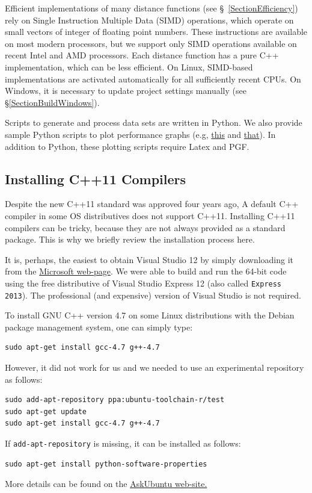 \documentclass[runningheads,a4paper]{llncs}
\newcommand{\ttt}[1]{\texttt{#1}}
\begin{document}
{Efficient implementations of many distance functions (see \S~\ref{SectionEfficiency})
rely on Single Instruction Multiple Data (SIMD) operations,
which operate on small  vectors of integer of floating point numbers. 
These instructions are available on most modern processors,
but we support only SIMD operations available on recent Intel and AMD processors.   
Each distance function has a pure C++ implementation,
which can be less efficient.
On Linux, SIMD-based implementations are activated automatically 
for all sufficiently recent CPUs. On Windows, it is necessary to update
project settings manually (see \S\ref{SectionBuildWindows}).

Scripts to generate and process data sets are written in Python.
We also provide sample Python scripts to plot performance graphs (e.g, \href{https://github.com/searchivarius/NonMetricSpaceLib/blob/master/sample_scripts/nips2013/figures/genplots_nips2013.py}{this} and \href{https://github.com/searchivarius/NonMetricSpaceLib/blob/master/sample_scripts/sisap2013/figures/genplots_sisap2013.py}{that}).
In addition to Python, these plotting scripts require Latex and PGF. 

\subsection{Installing C++11 Compilers}
Despite the new C++11 standard was approved four years ago, 
A default C++ compiler in some OS distributives does not support C++11.
Installing C++11 compilers can be tricky, 
because they are not always provided as a standard package.
This is why we briefly review the installation process here. 

It is, perhaps, the easiest to obtain Visual Studio 12 by simply downloading
it from the \href{http://www.microsoft.com/en-us/download/details.aspx?id=40787}{Microsoft 
web-page}.
We were able to build and run the 64-bit code using the free distributive of Visual Studio Express 12 (also called 
\texttt{Express 2013}). The professional (and expensive) version of Visual Studio is not required. 


To install GNU C++ version 4.7 on some Linux distributions with the Debian package management system, 
one can simply type:
\begin{verbatim}
sudo apt-get install gcc-4.7 g++-4.7
\end{verbatim}
However, it did not work for us and we needed to use an experimental repository as follows:
\begin{verbatim}
sudo add-apt-repository ppa:ubuntu-toolchain-r/test
sudo apt-get update
sudo apt-get install gcc-4.7 g++-4.7
\end{verbatim}
If \ttt{add-apt-repository} is missing, it can be installed as follows:
\begin{verbatim}
sudo apt-get install python-software-properties
\end{verbatim}
More details can be found on the \href{http://askubuntu.com/questions/113291/how-do-i-install-gcc-4-7}{AskUbuntu web-site.}

}
\end{document}
